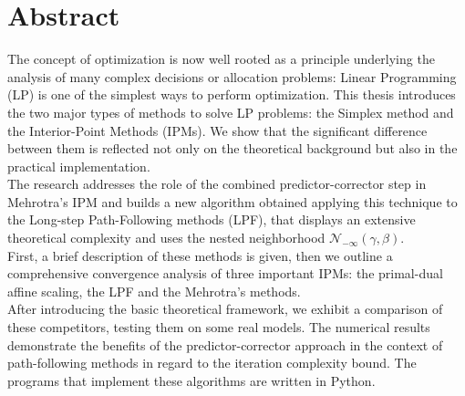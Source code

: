 \documentclass[a4paper,10 pt,titlepage,twoside]{book}
\theoremstyle{plain}
\theoremstyle{definition}
\theoremstyle{remark}
\begin{document}
\chapter*{Abstract}
The concept of optimization is now well rooted as a principle underlying the analysis
of many complex decisions or allocation problems: Linear Programming (LP) is one of the simplest ways to perform optimization.
This thesis introduces the two major types of methods to solve LP problems: the Simplex method and the Interior-Point Methods (IPMs).
We show that the significant difference between them is reflected not only on the theoretical background but also in the practical implementation.\\
The research addresses the role of the combined predictor-corrector step in Mehrotra's IPM and builds a new algorithm obtained applying this technique to the Long-step Path-Following methods (LPF), that displays an extensive theoretical complexity and uses the nested neighborhood $\mathcal{N}_{-\infty}(\gamma,\beta)$.\\
First, a brief description of these methods is given,
then we outline a comprehensive convergence analysis of three important IPMs: the primal-dual affine scaling, the LPF and the Mehrotra's methods. \\
After introducing the basic theoretical framework, we exhibit a comparison of these competitors, testing them on some real models. The numerical
results demonstrate the benefits of the predictor-corrector approach in the context of path-following methods in regard to the iteration complexity bound.
The programs that implement these algorithms are written in Python. 
\end{document}
